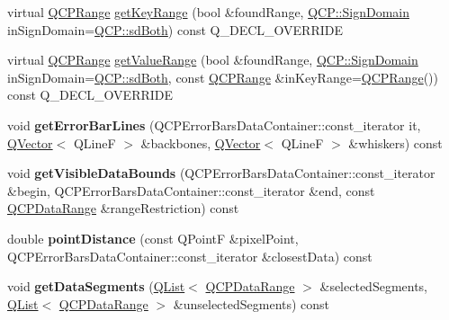 \begin{DoxyCompactItemize}
\item 
virtual \hyperlink{class_q_c_p_range}{Q\+C\+P\+Range} \hyperlink{class_q_c_p_error_bars_aa8850872dd67af338e612427ec595a13}{get\+Key\+Range} (bool \&found\+Range, \hyperlink{namespace_q_c_p_afd50e7cf431af385614987d8553ff8a9}{Q\+C\+P\+::\+Sign\+Domain} in\+Sign\+Domain=\hyperlink{namespace_q_c_p_afd50e7cf431af385614987d8553ff8a9a3dee7e9cd2fedce9253b83e172626a6c}{Q\+C\+P\+::sd\+Both}) const Q\+\_\+\+D\+E\+C\+L\+\_\+\+O\+V\+E\+R\+R\+I\+DE
\item 
virtual \hyperlink{class_q_c_p_range}{Q\+C\+P\+Range} \hyperlink{class_q_c_p_error_bars_a9fc99406c0fb5b39ce6dced1a8d8ba05}{get\+Value\+Range} (bool \&found\+Range, \hyperlink{namespace_q_c_p_afd50e7cf431af385614987d8553ff8a9}{Q\+C\+P\+::\+Sign\+Domain} in\+Sign\+Domain=\hyperlink{namespace_q_c_p_afd50e7cf431af385614987d8553ff8a9a3dee7e9cd2fedce9253b83e172626a6c}{Q\+C\+P\+::sd\+Both}, const \hyperlink{class_q_c_p_range}{Q\+C\+P\+Range} \&in\+Key\+Range=\hyperlink{class_q_c_p_range}{Q\+C\+P\+Range}()) const Q\+\_\+\+D\+E\+C\+L\+\_\+\+O\+V\+E\+R\+R\+I\+DE
\item 
void {\bfseries get\+Error\+Bar\+Lines} (Q\+C\+P\+Error\+Bars\+Data\+Container\+::const\+\_\+iterator it, \hyperlink{class_q_vector}{Q\+Vector}$<$ Q\+LineF $>$ \&backbones, \hyperlink{class_q_vector}{Q\+Vector}$<$ Q\+LineF $>$ \&whiskers) const \hypertarget{class_q_c_p_error_bars_afafbd781f0e702a773524d7ee9220741}{}\label{class_q_c_p_error_bars_afafbd781f0e702a773524d7ee9220741}

\item 
void {\bfseries get\+Visible\+Data\+Bounds} (Q\+C\+P\+Error\+Bars\+Data\+Container\+::const\+\_\+iterator \&begin, Q\+C\+P\+Error\+Bars\+Data\+Container\+::const\+\_\+iterator \&end, const \hyperlink{class_q_c_p_data_range}{Q\+C\+P\+Data\+Range} \&range\+Restriction) const \hypertarget{class_q_c_p_error_bars_a4d86d520222be51851106312dff75c49}{}\label{class_q_c_p_error_bars_a4d86d520222be51851106312dff75c49}

\item 
double {\bfseries point\+Distance} (const Q\+PointF \&pixel\+Point, Q\+C\+P\+Error\+Bars\+Data\+Container\+::const\+\_\+iterator \&closest\+Data) const \hypertarget{class_q_c_p_error_bars_a6701c510c6a0ad95d3335c6f2470eca0}{}\label{class_q_c_p_error_bars_a6701c510c6a0ad95d3335c6f2470eca0}

\item 
void {\bfseries get\+Data\+Segments} (\hyperlink{class_q_list}{Q\+List}$<$ \hyperlink{class_q_c_p_data_range}{Q\+C\+P\+Data\+Range} $>$ \&selected\+Segments, \hyperlink{class_q_list}{Q\+List}$<$ \hyperlink{class_q_c_p_data_range}{Q\+C\+P\+Data\+Range} $>$ \&unselected\+Segments) const \hypertarget{class_q_c_p_error_bars_a1e9fef8dd1853558c05d1235c1a1b033}{}\label{class_q_c_p_error_bars_a1e9fef8dd1853558c05d1235c1a1b033}


\end{DoxyCompactItemize}
